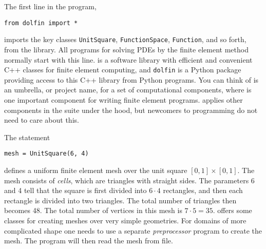 The first line in the program,
\begin{Verbatim}[fontsize=\fontsize{10pt}{10pt},tabsize=8,baselinestretch=1.05,
fontfamily=tt,xleftmargin=7mm]
from dolfin import *
\end{Verbatim}
\noindent
imports the key classes {\fontsize{12pt}{12pt}\verb!UnitSquare!},
{\fontsize{12pt}{12pt}\verb!FunctionSpace!}, {\fontsize{12pt}{12pt}\verb!Function!}, and so forth, from the \dolfin{} library.
All \fenics{} programs for solving PDEs by the finite element method
normally start with this line. \dolfin{} is a software library with efficient 
and convenient C++ classes for finite element computing, and
{\fontsize{12pt}{12pt}\texttt{dolfin}} is a Python package providing access to this
C++ library from Python programs. 
You can think of \fenics{} is an umbrella, or project name, for a set of
computational components, where \dolfin{} is one important component for
writing finite element programs. \dolfin{} applies other components
in the \fenics{} suite under the hood, but newcomers to \fenics{}
programming do not need to care about this.

The statement
\begin{Verbatim}[fontsize=\fontsize{10pt}{10pt},tabsize=8,baselinestretch=1.05,
fontfamily=tt,xleftmargin=7mm]
mesh = UnitSquare(6, 4)
\end{Verbatim}
\noindent
defines a uniform finite element mesh over the unit square
$[0,1]\times [0,1]$. The mesh consists of \emph{cells}, 
which are triangles with
straight sides. The parameters 6 and 4 tell that the square is
first divided into $6\cdot 4$ rectangles, and then each rectangle
is divided into two triangles. The total number of triangles
then becomes 48. The total number of vertices in this mesh is
$7\cdot 5=35$.
\dolfin{} offers some classes for creating meshes over
very simple geometries. For domains of more complicated shape one needs
to use a separate \emph{preprocessor} program to create the mesh. 
The \fenics{} program will then read the mesh from file.

